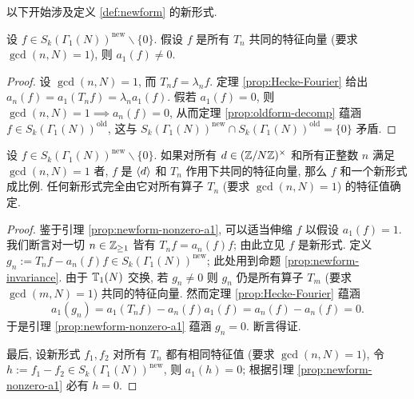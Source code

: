 以下开始涉及定义 \ref{def:newform} 的新形式.

\begin{lemma}\label{prop:newform-nonzero-a1}
	设 $f \in S_k(\Gamma_1(N))^{\mathrm{new}} \smallsetminus \{0\}$. 假设 $f$ 是所有 $T_n$ 共同的特征向量 (要求 $\gcd(n, N) = 1$), 则 $a_1(f) \neq 0$.
\end{lemma}
\begin{proof}
	设 $\gcd(n, N) = 1$, 而 $T_n f = \lambda_n f$. 定理 \ref{prop:Hecke-Fourier} 给出 $a_n(f) = a_1(T_n f) = \lambda_n a_1(f)$. 假若 $a_1(f) = 0$, 则 $\gcd(n, N) = 1 \implies a_n(f) = 0$, 从而定理 \ref{prop:oldform-decomp} 蕴涵 $f \in S_k(\Gamma_1(N))^{\mathrm{old}}$, 这与 $S_k(\Gamma_1(N))^{\mathrm{new}} \cap  S_k(\Gamma_1(N))^{\mathrm{old}} = \{0\}$ 矛盾.
\end{proof}

\begin{proposition}[弱重数一性质]\label{prop:weak-mult1}
	设 $f \in S_k(\Gamma_1(N))^{\mathrm{new}} \smallsetminus \{0\}$. 如果对所有 $d \in (\mathbb{Z}/N\mathbb{Z})^\times$ 和所有正整数 $n$ 满足 $\gcd(n,N) = 1$ 者, $f$ 是 $\left\langle d \right\rangle$ 和 $T_n$ 作用下共同的特征向量, 那么 $f$ 和一个新形式成比例. 任何新形式完全由它对所有算子 $T_n$ (要求 $\gcd(n, N) = 1$) 的特征值确定.
\end{proposition}
\begin{proof}
	鉴于引理 \ref{prop:newform-nonzero-a1}, 可以适当伸缩 $f$ 以假设 $a_1(f) = 1$. 我们断言对一切 $n \in \mathbb{Z}_{\geq 1}$ 皆有 $T_n f = a_n(f) f$; 由此立见 $f$ 是新形式. 定义 $g_n := T_n f - a_n(f) f \in S_k(\Gamma_1(N))^{\mathrm{new}}$; 此处用到命题 \ref{prop:newform-invariance}. 由于 $\mathbb{T}_1(N)$ 交换, 若 $g_n \neq 0$ 则 $g_n$ 仍是所有算子 $T_m$ (要求 $\gcd(m,N) = 1$) 共同的特征向量. 然而定理 \ref{prop:Hecke-Fourier} 蕴涵
	\[ a_1(g_n) = a_1(T_n f) - a_n(f) a_1(f) = a_n(f) - a_n(f) = 0. \]
	于是引理 \ref{prop:newform-nonzero-a1} 蕴涵 $g_n = 0$. 断言得证.
	
	最后, 设新形式 $f_1, f_2$ 对所有 $T_n$ 都有相同特征值 (要求 $\gcd(n, N) = 1$), 令 $h := f_1 - f_2 \in S_k(\Gamma_1(N))^{\mathrm{new}}$, 则 $a_1(h) = 0$; 根据引理 \ref{prop:newform-nonzero-a1} 必有 $h = 0$.
\end{proof}

